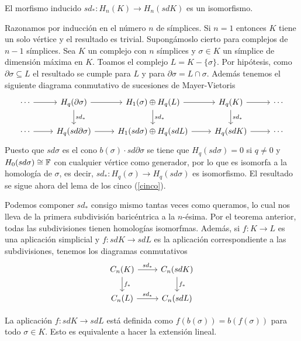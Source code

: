 \documentclass[HS.tex]{subfiles}
\begin{document}
\begin{teorema}
El morfismo inducido $sd_*:H_n(K)\to H_n(sdK)$ es un isomorfismo.
\end{teorema}
\begin{dem}
Razonamos por inducción en el número $n$ de símplices. Si $n=1$ entonces $K$ tiene un solo vértice y el resultado es trivial. Supongámoslo cierto para complejos de $n-1$ símplices. Sea $K$ un complejo con $n$ símplices y $\sigma\in K$ un símplice de dimensión máxima en $K$. Toamos el complejo $L=K-\{\sigma\}$. Por hipótesis, como $\partial\sigma\subseteq L$ el resultado se cumple para $L$ y para $\partial\sigma=L\cap\sigma$. Además tenemos el siguiente diagrama conmutativo de sucesiones de Mayer-Vietoris
\[
\begin{tikzcd}
\cdots\arrow[r] & H_q(\partial\sigma)\arrow[r]\arrow[d,"sd_*"] & H_1(\sigma)\oplus H_q(L)\arrow[r]\arrow[d, "sd_*"] & H_q(K)\arrow[d, "sd_*"]\arrow[r]&\cdots \\
\cdots\arrow[r] & H_q(sd\partial\sigma)\arrow[r]& H_1(sd\sigma)\oplus H_q(sdL)\arrow[r] & H_q(sdK)\arrow[r]&\cdots 
\end{tikzcd}
\]
Puesto que $sd\sigma$ es el cono $b(\sigma)\cdot sd\partial\sigma$ se tiene que $H_q(sd\sigma)=0$ si $q\neq 0$ y $H_0(sd\sigma)\cong\mathbb{F}$ con cualquier vértice como generador, por lo que es isomorfa a la homología de $\sigma$, es decir, $sd_*:H_q(\sigma)\to H_q(sd\sigma)$ es isomorfismo. El resultado se sigue ahora del lema de los cinco (\ref{cinco}). 
\QED
\end{dem}



\begin{observacion} Podemos componer $sd_*$ consigo mismo tantas veces como queramos, lo cual nos lleva de la primera subdivisión baricéntrica a la $n$-ésima. Por el teorema anterior, todas las subdivisiones tienen homologías isomorfmas. Además, si $f:K\to L$ es una aplicación simplicial y $f:sdK\to sdL$ es la aplicación correspondiente a las subdivisiones, tenemos los diagramas conmutativos 
\[
\begin{tikzcd}
C_n(K)\arrow[r,"sd_*"]\arrow[d,"f_*"] & C_n(sdK)\arrow[d,"f_*"]\\
C_n(L)\arrow[r,"sd_*"] & C_n(sdL)
\end{tikzcd}
\]


La aplicación $f:sdK\to sdL$ está definida como $f(b(\sigma))=b(f(\sigma))$ para todo $\sigma\in K$. Esto es equivalente a hacer la extensión lineal.


\end{observacion}
\end{document}
